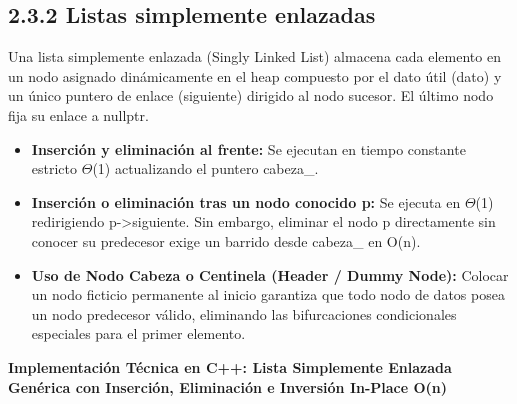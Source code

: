 \documentclass[11pt,letterpaper]{article}
\begin{document}
\subsection*{2.3.2 Listas simplemente enlazadas}
Una lista simplemente enlazada (Singly Linked List) almacena cada elemento en un nodo asignado dinámicamente en el heap compuesto por el dato útil (dato) y un único puntero de enlace (siguiente) dirigido al nodo sucesor. El último nodo fija su enlace a nullptr.\par
\begin{itemize}
\setlength{\itemsep}{2pt}\setlength{\parskip}{0pt}
  \item \textbf{Inserción y eliminación al frente: }Se ejecutan en tiempo constante estricto $\Theta$(1) actualizando el puntero cabeza\_.
  \item \textbf{Inserción o eliminación tras un nodo conocido p: }Se ejecuta en $\Theta$(1) redirigiendo p->siguiente. Sin embargo, eliminar el nodo p directamente sin conocer su predecesor exige un barrido desde cabeza\_ en O(n).
  \item \textbf{Uso de Nodo Cabeza o Centinela (Header / Dummy Node): }Colocar un nodo ficticio permanente al inicio garantiza que todo nodo de datos posea un nodo predecesor válido, eliminando las bifurcaciones condicionales especiales para el primer elemento.
\end{itemize}
\vspace{4pt}\noindent\textbf{\color{ipnblue}Implementación Técnica en C++: Lista Simplemente Enlazada Genérica con Inserción, Eliminación e Inversión In-Place O(n)}\par\vspace{-2pt}
\end{document}
